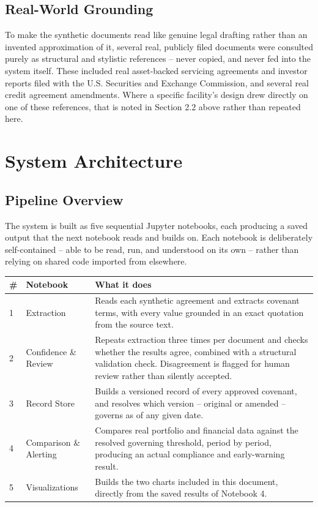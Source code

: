 \documentclass[11pt,a4paper]{article}
\begin{document}
\subsection{Real-World Grounding}

To make the synthetic documents read like genuine legal drafting rather than an invented approximation of it, several real, publicly filed documents were consulted purely as structural and stylistic references -- never copied, and never fed into the system itself. These included real asset-backed servicing agreements and investor reports filed with the U.S. Securities and Exchange Commission, and several real credit agreement amendments. Where a specific facility's design drew directly on one of these references, that is noted in Section 2.2 above rather than repeated here.

\newpage
\section{System Architecture}

\subsection{Pipeline Overview}

The system is built as five sequential Jupyter notebooks, each producing a saved output that the next notebook reads and builds on. Each notebook is deliberately self-contained -- able to be read, run, and understood on its own -- rather than relying on shared code imported from elsewhere.

\begin{center}
\renewcommand{\arraystretch}{1.3}
\begin{tabular}{@{}p{0.6cm}p{3.6cm}p{9.2cm}@{}}
\toprule
\textbf{\#} & \textbf{Notebook} & \textbf{What it does} \\
\midrule
1 & Extraction & Reads each synthetic agreement and extracts covenant terms, with every value grounded in an exact quotation from the source text. \\
2 & Confidence \& Review & Repeats extraction three times per document and checks whether the results agree, combined with a structural validation check. Disagreement is flagged for human review rather than silently accepted. \\
3 & Record Store & Builds a versioned record of every approved covenant, and resolves which version -- original or amended -- governs as of any given date. \\
4 & Comparison \& Alerting & Compares real portfolio and financial data against the resolved governing threshold, period by period, producing an actual compliance and early-warning result. \\
5 & Visualizations & Builds the two charts included in this document, directly from the saved results of Notebook 4. \\
\bottomrule
\end{tabular}
\end{center}
\end{document}
